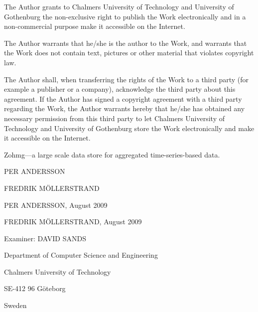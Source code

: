 \pagebreak


\setcounter{page}{1}

\noindent The Author grants to Chalmers University of Technology and University
of Gothenburg the non-exclusive right to publish the Work electronically and in
a non-commercial purpose make it accessible on the Internet.

\vspace{12pt}

\noindent The Author warrants that he/she is the author to the Work, and
warrants that the Work does not contain text, pictures or other material that
violates copyright law.

\vspace{12pt}

\noindent The Author shall, when transferring the rights of the Work to a third
party (for example a publisher or a company), acknowledge the third party about
this agreement. If the Author has signed a copyright agreement with a third
party regarding the Work, the Author warrants hereby that he/she has obtained
any necessary permission from this third party to let Chalmers University of
Technology and University of Gothenburg store the Work electronically and make
it accessible on the Internet.

\vspace{64pt}

\noindent Zohmg---a large scale data store for aggregated time-series-based
data.


\vspace{24pt}


\noindent PER ANDERSSON

\noindent FREDRIK M{\"O}LLERSTRAND


\vspace{12pt}


\noindent {\copyright} PER ANDERSSON, August 2009

\noindent {\copyright} FREDRIK M{\"O}LLERSTRAND, August 2009


\vspace{12pt}


\noindent Examiner: DAVID SANDS


\vspace{72pt}


\noindent Department of Computer Science and Engineering

\noindent Chalmers University of Technology

\noindent SE-412 96 G{\"o}teborg

\noindent Sweden


